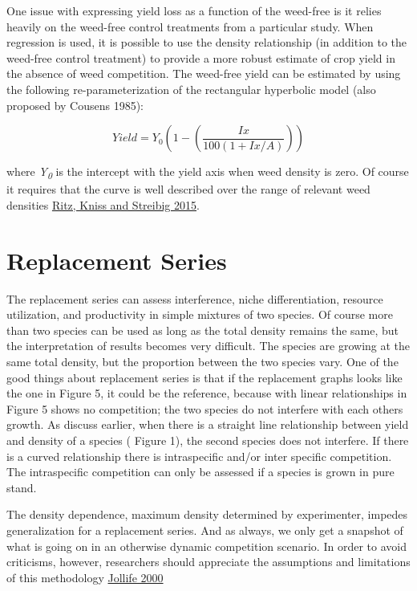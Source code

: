 \documentclass[letterpaper,]{book}
\begin{document}
One issue with expressing yield loss as a function of the weed-free is it relies heavily on the weed-free control treatments from a particular study. When regression is used, it is possible to use the density relationship (in addition to the weed-free control treatment) to provide a more robust estimate of crop yield in the absence of weed competition. The weed-free yield can be estimated by using the following re-parameterization of the rectangular hyperbolic model (also proposed by Cousens 1985):

\[Yield = Y_0(1-(\frac{Ix}{100(1+Ix/A)})) \]

where \emph{Y\textsubscript{0}} is the intercept with the yield axis when weed density is zero. Of course it requires that the curve is well described over the range of relevant weed densities \href{http://www.wssajournals.org/doi/pdf/10.1614/WS-D-13-00159.1}{Ritz, Kniss and Streibig 2015}.

\hypertarget{replacement-series}{%
\section{Replacement Series}\label{replacement-series}}

The replacement series can assess interference, niche differentiation, resource utilization, and productivity in simple mixtures of two species. Of course more than two species can be used as long as the total density remains the same, but the interpretation of results becomes very difficult. The species are growing at the same total density, but the proportion between the two species vary. One of the good things about replacement series is that if the replacement graphs looks like the one in Figure 5, it could be the reference, because with linear relationships in Figure 5 shows no competition; the two species do not interfere with each others growth. As discuss earlier, when there is a straight line relationship between yield and density of a species ( Figure 1), the second species does not interfere. If there is a curved relationship there is intraspecific and/or inter specific competition. The intraspecific competition can only be assessed if a species is grown in pure stand.

The density dependence, maximum density determined by experimenter, impedes generalization for a replacement series. And as always, we only get a snapshot of what is going on in an otherwise dynamic competition scenario. In order to avoid criticisms, however, researchers should appreciate the assumptions and limitations of this methodology \href{http://onlinelibrary.wiley.com/doi/10.1046/j.1365-2745.2000.00470.x/pdf}{Jollife 2000}
\end{document}
